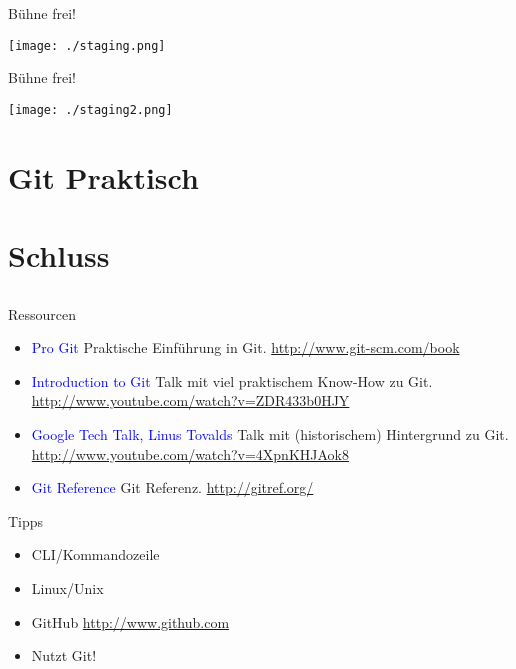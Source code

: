 \begin{frame}{Bühne frei!}
    \centerline{\texttt{[image: ./staging.png]}}
\end{frame}

\begin{frame}{Bühne frei!}
    \centerline{\texttt{[image: ./staging2.png]}}
\end{frame}

\section{Git Praktisch}

\section{Schluss}
\subsection{}

\begin{frame}{Ressourcen}
    \begin{itemize}[<+->]
        \item \textcolor{blue}{Pro Git} Praktische Einführung in Git. \url{http://www.git-scm.com/book}
        \item \textcolor{blue}{Introduction to Git} Talk mit viel praktischem Know-How zu Git. \url{http://www.youtube.com/watch?v=ZDR433b0HJY}
        \item \textcolor{blue}{Google Tech Talk, Linus Tovalds} Talk mit (historischem) Hintergrund zu Git. \url{http://www.youtube.com/watch?v=4XpnKHJAok8}
        \item \textcolor{blue}{Git Reference} Git Referenz. \url{http://gitref.org/}
    \end{itemize}
\end{frame}

\begin{frame}{Tipps}
    \begin{itemize}[<+->]
        \item CLI/Kommandozeile
        \item Linux/Unix
        \item GitHub \url{http://www.github.com}
        \item Nutzt Git!
    \end{itemize}
\end{frame}



